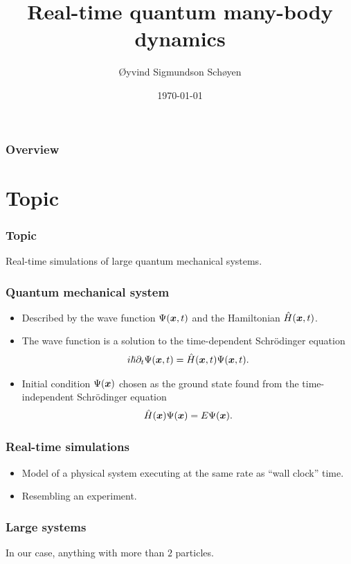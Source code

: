 \documentclass{beamer}
\author{Øyvind Sigmundson Schøyen}
\title{Real-time quantum many-body dynamics}
\institute{University of Oslo}
\date{\today}
\begin{document}
\begin{frame}
    \titlepage
\end{frame}

\begin{frame}
    \frametitle{Overview}
    \tableofcontents
\end{frame}

\section{Topic}

\begin{frame}
    \frametitle{Topic}
    Real-time simulations of large quantum mechanical systems.
\end{frame}

\begin{frame}
    \frametitle{Quantum mechanical system}
    \begin{itemize}
        \item Described by the wave function $\Psi(\boldsymbol{x}, t)$ and the Hamiltonian
            $\hat{H}(\boldsymbol{x}, t)$.
        \item The wave function is a solution to the time-dependent Schrödinger
            equation
            \begin{align}
                i\hslash \partial_t\Psi(\boldsymbol{x}, t)
                = \hat{H}(\boldsymbol{x}, t)\Psi(\boldsymbol{x}, t).
            \end{align}
        \item Initial condition $\Psi(\boldsymbol{x})$ chosen as the ground state found
            from the time-independent Schrödinger equation
            \begin{align}
                \hat{H}(\boldsymbol{x})\Psi(\boldsymbol{x}) = E\Psi(\boldsymbol{x}).
            \end{align}
    \end{itemize}
\end{frame}

\begin{frame}
    \frametitle{Real-time simulations}
    \begin{itemize}
        \item Model of a physical system executing at the same rate as ``wall
            clock'' time.
        \item Resembling an experiment.
    \end{itemize}
\end{frame}

\begin{frame}
    \frametitle{Large systems}
    In our case, anything with more than $2$ particles.
\end{frame}
\end{document}
